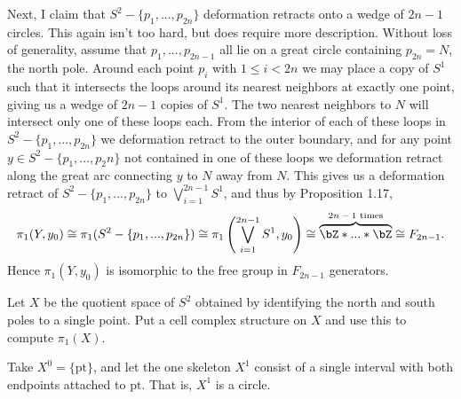 \begin{homework}[e]
\begin{prf}
    Next, I claim that $S^2 - \{p_1,...,p_{2n}\}$ deformation retracts onto a wedge of $2n - 1$ circles. This again isn't too hard, but does require more description. Without loss of generality, assume that $p_1,...,p_{2n-1}$ all lie on a great circle containing $p_{2n} = N$, the north pole. Around each point $p_i$ with $1\leq i < 2n$ we may place a copy of $S^1$ such that it intersects the loops around its nearest neighbors at exactly one point, giving us a wedge of $2n-1$ copies of $S^1$. The two nearest neighbors to $N$ will intersect only one of these loops each. From the interior of each of these loops in $S^2 - \{p_1,...,p_{2n}\}$ we deformation retract to the outer boundary, and for any point $y \in S^2 - \{p_1,...,p_2n\}$ not contained in one of these loops we deformation retract along the great arc connecting $y$ to $N$ away from $N$. This gives us a deformation retract of $S^2 - \{p_1,...,p_{2n}\}$ to $\bigvee_{i=1}^{2n-1}S^1$, and thus by Proposition 1.17,
    \begin{align*}
      \pi_1(Y,y_0) \cong \pi_1(S^2 - \{p_1,...,p_{2n}\}) \cong \pi_1\left(\bigvee_{i=1}^{2n-1}S^1,y_0\right) \cong \overbrace{\bZ\ast...\ast\bZ}^{\text{$2n-1$ times}} \cong F_{2n-1}.
    \end{align*}
    Hence $\pi_{1}(Y,y_0)$ is isomorphic to the free group in $F_{2n-1}$ generators.
  \end{prf}
   Let $X$ be the quotient space of $S^2$ obtained by identifying the north and south poles to a single point. Put a cell complex structure on $X$ and use this to compute $\pi_1(X)$.
  \begin{prf}
    Take $X^0 = \{\text{pt}\}$, and let the one skeleton $X^1$ consist of a single interval with both endpoints attached to $\text{pt}$. That is, $X^1$ is a circle.


\end{prf}
\end{homework}
